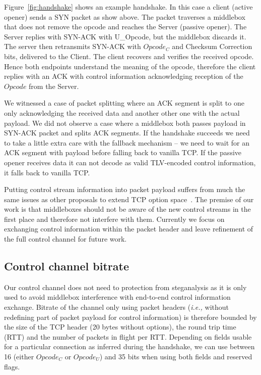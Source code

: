 \documentclass{sig-alternate-10pt}
\providecommand{\ie}{\emph{i.e.,} }
\begin{document}
Figure~\ref{fig:handshake} shows an example handshake. In this case a client (active opener) sends a SYN packet as show above. The packet traverses a middlebox that does not remove the opcode and reaches the Server (passive opener). The Server replies with SYN-ACK with U\_Opcode, but the middlebox discards it. The server then retransmits SYN-ACK with $Opcode_C$ and Checksum Correction bits, delivered to the Client. The client recovers and verifies the received opcode. Hence both endpoints understand the meaning of the opcode, therefore the client replies with an ACK with control information acknowledging reception of the $Opcode$ from the Server.

We witnessed a case of packet splitting where an ACK segment is split to one only acknowledging the received data and another other one with the actual payload. We did not observe a case where a middlebox both passes payload in SYN-ACK packet and splits ACK segments. If the handshake succeeds we need to take a little extra care with the fallback mechanism -- we need to wait for an ACK segment with payload before falling back to vanilla TCP. If the passive opener receives data it can not decode as valid TLV-encoded control information, it falls back to vanilla TCP.

Putting control stream information into packet payload suffers from much the same issues as other proposals to extend TCP option space~\cite{Ramaiah:2012wa}. The premise of our work is that middleboxes should not be aware of the new control streams in the first place and therefore not interfere with them. Currently we focus on exchanging control information within the packet header and leave refinement of the full control channel for future work.

\subsection{Control channel bitrate}


Our control channel does not need to protection from steganalysis as it is only used to avoid middlebox interference with end-to-end control information exchange. Bitrate of the channel only using packet headers (\ie without redefining part of packet payload for control information) is therefore bounded by the size of the TCP header (20 bytes without options), the round trip time (RTT) and the number of packets in flight per RTT. Depending on fields usable for a particular connection as inferred during the handshake, we can use between 16 (either $Opcode_C$ or $Opcode_U$) and 35 bits when using both fields and reserved flags.
\end{document}
